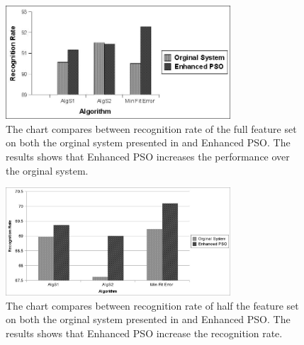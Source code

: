 \documentclass[10pt]{article}
\begin{document}
 
    \begin{figure}
  \centering
  \includegraphics[width=3.3in]{Experiment92.jpg}
  \caption[Recognition accuracy]%
  {The chart compares between recognition rate of the full feature set on both the orginal system presented in \cite{mypaper} and Enhanced PSO. The results shows that Enhanced PSO increases the performance over the orginal system. }
   \label{exp2}
\end{figure}
\begin{figure}
  \centering
  \includegraphics[width=3.3in]{Experiment68.jpg}
  \caption[Recognition accuracy]%
  {The chart compares between recognition rate of half the feature set on both the orginal system presented in \cite{mypaper} and Enhanced PSO. The results shows that Enhanced PSO increase the recognition rate. }
   \label{exp1}
\end{figure}

 
\end{document}
